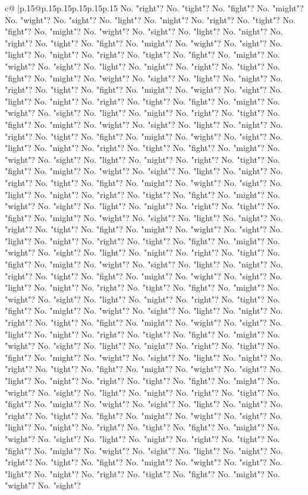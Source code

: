 \documentclass{article}
\begin{document}
{\begin{supertabular}{c@{$\;$}|p{.15\linewidth}@{}p{.15\linewidth}p{.15\linewidth}p{.15\linewidth}p{.15\linewidth}p{.15\linewidth}}
{{{No. "right"? No. "tight"? No. "fight"? No. "might"? No. "wight"? No. "sight"? No. "light"? No. "night"? No. "right"? No. "tight"? No. "fight"? No. "might"? No. "wight"? No. "sight"? No. "light"? No. "night"? No. "right"? No. "tight"? No. "fight"? No. "might"? No. "wight"? No. "sight"? No. "light"? No. "night"? No. "right"? No. "tight"? No. "fight"? No. "might"? No. "wight"? No. "sight"? No. "light"? No. "night"? No. "right"? No. "tight"? No. "fight"? No. "might"? No. "wight"? No. "sight"? No. "light"? No. "night"? No. "right"? No. "tight"? No. "fight"? No. "might"? No. "wight"? No. "sight"? No. "light"? No. "night"? No. "right"? No. "tight"? No. "fight"? No. "might"? No. "wight"? No. "sight"? No. "light"? No. "night"? No. "right"? No. "tight"? No. "fight"? No. "might"? No. "wight"? No. "sight"? No. "light"? No. "night"? No. "right"? No. "tight"? No. "fight"? No. "might"? No. "wight"? No. "sight"? No. "light"? No. "night"? No. "right"? No. "tight"? No. "fight"? No. "might"? No. "wight"? No. "sight"? No. "light"? No. "night"? No. "right"? No. "tight"? No. "fight"? No. "might"? No. "wight"? No. "sight"? No. "light"? No. "night"? No. "right"? No. "tight"? No. "fight"? No. "might"? No. "wight"? No. "sight"? No. "light"? No. "night"? No. "right"? No. "tight"? No. "fight"? No. "might"? No. "wight"? No. "sight"? No. "light"? No. "night"? No. "right"? No. "tight"? No. "fight"? No. "might"? No. "wight"? No. "sight"? No. "light"? No. "night"? No. "right"? No. "tight"? No. "fight"? No. "might"? No. "wight"? No. "sight"? No. "light"? No. "night"? No. "right"? No. "tight"? No. "fight"? No. "might"? No. "wight"? No. "sight"? No. "light"? No. "night"? No. "right"? No. "tight"? No. "fight"? No. "might"? No. "wight"? No. "sight"? No. "light"? No. "night"? No. "right"? No. "tight"? No. "fight"? No. "might"? No. "wight"? No. "sight"? No. "light"? No. "night"? No. "right"? No. "tight"? No. "fight"? No. "might"? No. "wight"? No. "sight"? No. "light"? No. "night"? No. "right"? No. "tight"? No. "fight"? No. "might"? No. "wight"? No. "sight"? No. "light"? No. "night"? No. "right"? No. "tight"? No. "fight"? No. "might"? No. "wight"? No. "sight"? No. "light"? No. "night"? No. "right"? No. "tight"? No. "fight"? No. "might"? No. "wight"? No. "sight"? No. "light"? No. "night"? No. "right"? No. "tight"? No. "fight"? No. "might"? No. "wight"? No. "sight"? No. "light"? No. "night"? No. "right"? No. "tight"? No. "fight"? No. "might"? No. "wight"? No. "sight"? No. "light"? No. "night"? No. "right"? No. "tight"? No. "fight"? No. "might"? No. "wight"? No. "sight"? No. "light"? No. "night"? No. "right"? No. "tight"? No. "fight"? No. "might"? No. "wight"? No. "sight"? No. "light"? No. "night"? No. "right"? No. "tight"? No. "fight"? No. "might"? No. "wight"? No. "sight"? No. "light"? No. "night"? No. "right"? No. "tight"? No. "fight"? No. "might"? No. "wight"? No. "sight"? No. "light"? No. "night"? No. "right"? No. "tight"? No. "fight"? No. "might"? No. "wight"? No. "sight"? No. "light"? No. "night"? No. "right"? No. "tight"? No. "fight"? No. "might"? No. "wight"? No. "sight"? No. "light"? No. "night"? No. "right"? No. "tight"? No. "fight"? No. "might"? No. "wight"? No. "sight"? }}}
\end{supertabular}}
\end{document}
